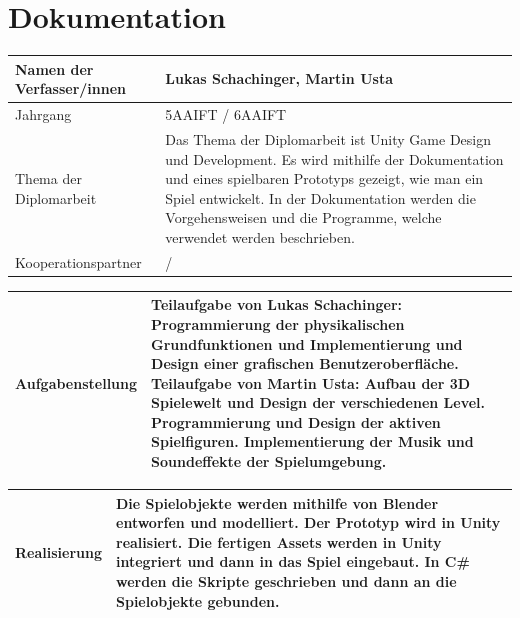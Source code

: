 \chapter*{Dokumentation}

\renewcommand{\arraystretch}{2} %

\begin{tabular}{|m{}|m{}|}
\hline
Namen der Verfasser/innen & Lukas Schachinger, Martin Usta \\
\hline
Jahrgang & 5AAIFT / 6AAIFT \\
\hline
Thema der Diplomarbeit & Das Thema der Diplomarbeit ist Unity Game Design und Development. Es wird mithilfe der Dokumentation und eines spielbaren Prototyps gezeigt, wie man ein Spiel entwickelt. 
In der Dokumentation werden die Vorgehensweisen und die Programme, welche verwendet werden beschrieben. \\
\hline
Kooperationspartner & / \\
\hline
\end{tabular}

\vspace{10pt}

\noindent
\begin{tabular}{|m{}|m{}|}
\hline
Aufgabenstellung & Teilaufgabe von Lukas Schachinger: \newline \newline Programmierung der physikalischen Grundfunktionen und Implementierung und Design einer grafischen Benutzeroberfläche. \newline \newline Teilaufgabe von Martin Usta: \newline \newline Aufbau der 3D Spielewelt und Design der verschiedenen Level. Programmierung und Design der aktiven Spielfiguren. Implementierung der Musik und Soundeffekte der Spielumgebung.\\
\hline
\end{tabular}

\pagebreak

\noindent
\begin{tabular}{|m{}|m{}|}
\hline
Realisierung & Die Spielobjekte werden mithilfe von Blender entworfen und modelliert. \newline \newline Der Prototyp wird in Unity realisiert. Die fertigen Assets werden in Unity integriert und dann in das Spiel eingebaut. \newline \newline In C\# werden die Skripte geschrieben und dann an die Spielobjekte gebunden. \\
\hline
\end{tabular}

